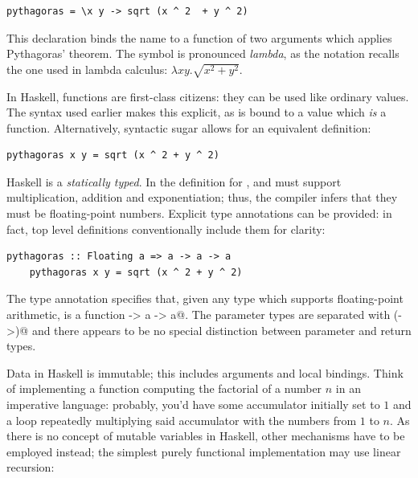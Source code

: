 \documentclass[UdineBachThesis,american,11pt]{PhdThesis}
\begin{document}
  \begin{lstlisting}[gobble=4,basicstyle=\ttfamily\small]
    pythagoras = \x y -> sqrt (x ^ 2  + y ^ 2)
  \end{lstlisting}

  \pagebreak

  This declaration binds the name \lstinline@pythagoras@ to a function of two
  arguments which applies Pythagoras' theorem. The symbol \lstinline@\@ is
  pronounced \emph{lambda}, as the notation recalls the one used in lambda
  calculus: $\lambda x y . \sqrt{x^2 + y^2}$.

  In Haskell, functions are first-class citizens: they can be used like ordinary
  values. The syntax used earlier makes this explicit, as \lstinline@pythagoras@
  is bound to a value which \emph{is} a function. Alternatively, syntactic sugar
  allows for an equivalent definition:

  \begin{lstlisting}[gobble=4,basicstyle=\ttfamily\small]
    pythagoras x y = sqrt (x ^ 2 + y ^ 2)
  \end{lstlisting}

  Haskell is a \emph{statically typed}. In the definition for
  \lstinline@pythagoras@, \lstinline@x@ and \lstinline@y@ must support
  multiplication, addition and exponentiation; thus, the compiler infers that
  they must be floating-point numbers. Explicit type annotations can be
  provided: in fact, top level definitions conventionally include them for
  clarity:

  \begin{lstlisting}[gobble=4,basicstyle=\ttfamily\small]
    pythagoras :: Floating a => a -> a -> a
    pythagoras x y = sqrt (x ^ 2 + y ^ 2)
  \end{lstlisting}

  The type annotation specifies that, given any type \lstinline@a@ which
  supports floating-point arithmetic, \lstinline@pythagoras@ is a function
  \lstinline@a -> a -> a@. The parameter types are separated with
  \lstinline@(->)@ and there appears to be no special distinction between
  parameter and return types.

  Data in Haskell is immutable; this includes arguments and local bindings.
  Think of implementing a function computing the factorial of a number $n$ in an
  imperative language: probably, you'd have some accumulator initially set to
  $1$ and a loop repeatedly multiplying said accumulator with the numbers from
  $1$ to $n$. As there is no concept of mutable variables in Haskell, other
  mechanisms have to be employed instead; the simplest purely functional
  implementation may use linear recursion:
\end{document}
